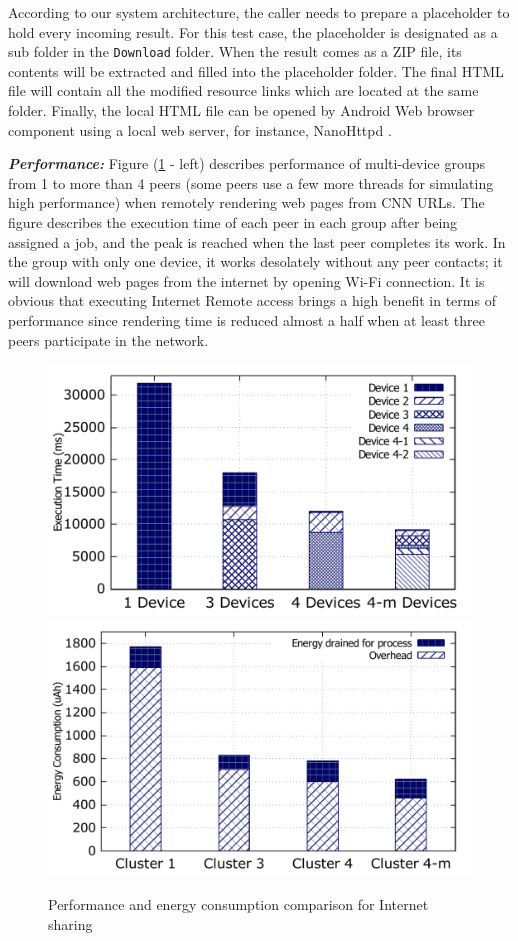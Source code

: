 \documentclass{sig-alternate}[10pt]
\begin{document}
According to our system architecture, the caller needs to prepare a placeholder to hold every incoming result. For this test case, the placeholder is designated as a sub folder in the \texttt{Download} folder. When the result comes as a ZIP file, its contents will be extracted and filled into the placeholder folder. The final HTML file will contain all the modified resource links which are located at the same folder. Finally, the local HTML file can be opened by Android Web browser component using a local web server, for instance, NanoHttpd \cite{nanohttpd}.

\textbf{\emph{Performance:}}
Figure (\ref{fig:net_clusters_perf} - left) describes performance of multi-device groups from 1 to more than 4 peers (some peers use a few more threads for simulating high performance) when remotely rendering web pages from CNN URLs. The figure describes the execution time of each peer in each group after being assigned a job, and the peak is reached when the last peer completes its work. In the group with only one device, it works desolately without any peer contacts; it will download web pages from the internet by opening Wi-Fi connection. It is obvious that executing Internet Remote access brings a high benefit in terms of performance since rendering time is reduced almost a half when at least three peers participate in the network. 


\begin{figure}
	\centering
		\includegraphics[width=.45\textwidth]{data/net_perf_01.pdf}
		\includegraphics[width=.45\textwidth]{data/net_energy.pdf}
	\caption{Performance and energy consumption comparison for Internet sharing}
	\label{fig:net_clusters_perf}
\end{figure}
\end{document}

